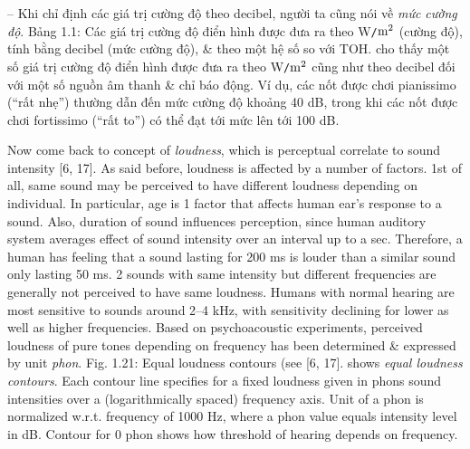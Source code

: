 \documentclass{article}
\begin{document}
\begin{itemize}
\begin{itemize}
\begin{itemize}
			-- Khi chỉ định các giá trị cường độ theo decibel, người ta cũng nói về {\it mức cường độ}. {\sf Bảng 1.1: Các giá trị cường độ điển hình được đưa ra theo W{\tt/}$\rm m^2$ (cường độ), tính bằng decibel (mức cường độ), \& theo một hệ số so với TOH.} cho thấy một số giá trị cường độ điển hình được đưa ra theo W{\tt/}$\rm m^2$ cũng như theo decibel đối với một số nguồn âm thanh \& chỉ báo động. Ví dụ, các nốt được chơi pianissimo (``rất nhẹ'') thường dẫn đến mức cường độ khoảng 40 dB, trong khi các nốt được chơi fortissimo (``rất to'') có thể đạt tới mức lên tới 100 dB.
			
			Now come back to concept of {\it loudness}, which is perceptual correlate to sound intensity [6, 17]. As said before, loudness is affected by a number of factors. 1st of all, same sound may be perceived to have different loudness depending on individual. In particular, age is 1 factor that affects human ear's response to a sound. Also, duration of sound influences perception, since human auditory system averages effect of sound intensity over an interval up to a sec. Therefore, a human has feeling that a sound lasting for 200 ms is louder than a similar sound only lasting 50 ms. 2 sounds with same intensity but different frequencies are generally not perceived to have same loudness. Humans with normal hearing are most sensitive to sounds around 2--4 kHz, with sensitivity declining for lower as well as higher frequencies. Based on psychoacoustic experiments, perceived loudness of pure tones depending on frequency has been determined \& expressed by unit {\it phon}. {\sf Fig. 1.21: Equal loudness contours (see [6, 17].} shows {\it equal loudness contours}. Each contour line specifies for a fixed loudness given in phons sound intensities over a (logarithmically spaced) frequency axis. Unit of a phon is normalized w.r.t. frequency of 1000 Hz, where a phon value equals intensity level in dB. Contour for 0 phon shows how threshold of hearing depends on frequency.
			

\end{itemize}
\end{itemize}
\end{itemize}
\end{document}
